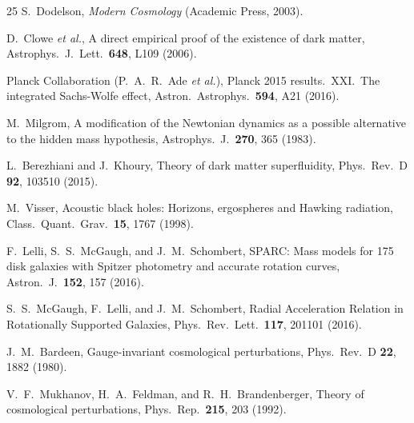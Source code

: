 \documentclass[12pt, a4paper]{article}
\begin{document}
\begin{thebibliography}{25}
S.~Dodelson,
\emph{Modern Cosmology} (Academic Press, 2003).

D.~Clowe \emph{et al.},
A direct empirical proof of the existence of dark matter,
Astrophys.\ J.\ Lett.\ \textbf{648}, L109 (2006).

Planck Collaboration (P.~A.~R.~Ade \emph{et al.}),
Planck 2015 results.\ XXI.\ The integrated Sachs-Wolfe effect,
Astron.\ Astrophys.\ \textbf{594}, A21 (2016).

M.~Milgrom,
A modification of the Newtonian dynamics as a possible alternative to the hidden mass hypothesis,
Astrophys.\ J.\ \textbf{270}, 365 (1983).

L.~Berezhiani and J.~Khoury,
Theory of dark matter superfluidity,
Phys.\ Rev.\ D \textbf{92}, 103510 (2015).

M.~Visser,
Acoustic black holes: Horizons, ergospheres and Hawking radiation,
Class.\ Quant.\ Grav.\ \textbf{15}, 1767 (1998).

F.~Lelli, S.~S.~McGaugh, and J.~M.~Schombert,
SPARC: Mass models for 175 disk galaxies with Spitzer
photometry and accurate rotation curves,
Astron.\ J.\ \textbf{152}, 157 (2016).

S.~S.~McGaugh, F.~Lelli, and J.~M.~Schombert,
Radial Acceleration Relation in Rotationally Supported
Galaxies,
Phys.\ Rev.\ Lett.\ \textbf{117}, 201101 (2016).

J.~M.~Bardeen,
Gauge-invariant cosmological perturbations,
Phys.\ Rev.\ D \textbf{22}, 1882 (1980).

V.~F.~Mukhanov, H.~A.~Feldman, and R.~H.~Brandenberger,
Theory of cosmological perturbations,
Phys.\ Rep.\ \textbf{215}, 203 (1992).

\end{thebibliography}
\end{document}
